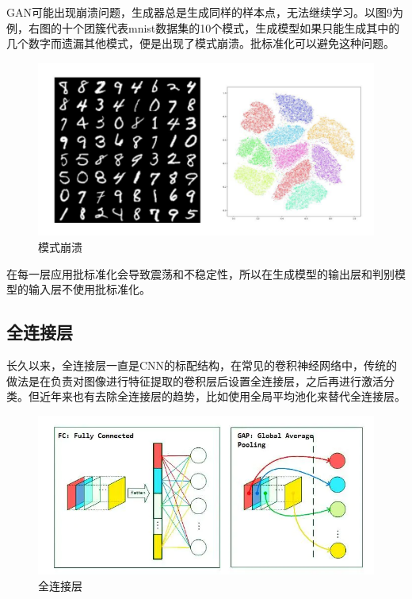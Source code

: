 \documentclass[
  hyperref, a4paper]{ctexart}
\begin{document}
GAN可能出现崩溃问题，生成器总是生成同样的样本点，无法继续学习。以图9为例，右图的十个团簇代表mnist数据集的10个模式，生成模型如果只能生成其中的几个数字而遗漏其他模式，便是出现了模式崩溃。批标准化可以避免这种问题。

\begin{figure}
\centering
\includegraphics{9.png}
\caption{模式崩溃}
\end{figure}

在每一层应用批标准化会导致震荡和不稳定性，所以在生成模型的输出层和判别模型的输入层不使用批标准化。

\hypertarget{ux5168ux8fdeux63a5ux5c42}{%
\subsection{全连接层}\label{ux5168ux8fdeux63a5ux5c42}}

长久以来，全连接层一直是CNN的标配结构，在常见的卷积神经网络中，传统的做法是在负责对图像进行特征提取的卷积层后设置全连接层，之后再进行激活分类。但近年来也有去除全连接层的趋势，比如使用全局平均池化来替代全连接层。

\begin{figure}
\centering
\includegraphics{./10.png}
\caption{全连接层}
\end{figure}
\end{document}
